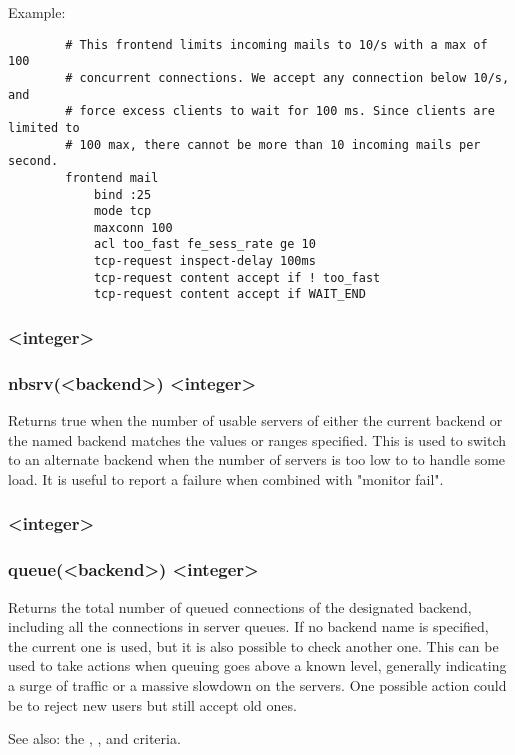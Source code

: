   Example:
  \begin{verbatim}
        # This frontend limits incoming mails to 10/s with a max of 100
        # concurrent connections. We accept any connection below 10/s, and
        # force excess clients to wait for 100 ms. Since clients are limited to
        # 100 max, there cannot be more than 10 incoming mails per second.
        frontend mail
            bind :25
            mode tcp
            maxconn 100
            acl too_fast fe_sess_rate ge 10
            tcp-request inspect-delay 100ms
            tcp-request content accept if ! too_fast
            tcp-request content accept if WAIT_END
  \end{verbatim}

\subsubsection[nbsrv]{ <integer>}
\subsubsection*{nbsrv(<backend>) <integer>}
  Returns true when the number of usable servers of either the current backend
  or the named backend matches the values or ranges specified. This is used to
  switch to an alternate backend when the number of servers is too low to
  to handle some load. It is useful to report a failure when combined with
  "monitor fail".

\subsubsection[queue]{ <integer>}
\subsubsection*{queue(<backend>) <integer>}
  Returns the total number of queued connections of the designated backend,
  including all the connections in server queues. If no backend name is
  specified, the current one is used, but it is also possible to check another
  one. This can be used to take actions when queuing goes above a known level,
  generally indicating a surge of traffic or a massive slowdown on the servers.
  One possible action could be to reject new users but still accept old ones.

See also: the , , and  criteria.

\subsubsection[sc1\_bytes\_in\_rate]{}
